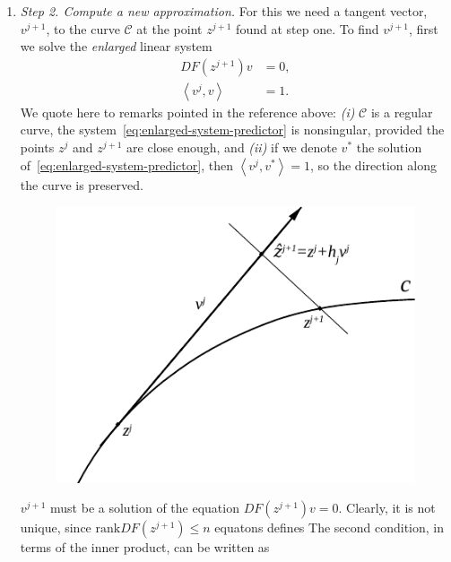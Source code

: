 \documentclass[11pt,reqno,twoside]{article}
\theoremstyle{remark}
\begin{document}
\begin{enumerate}[label = \emph{\arabic*.}]
\begin{displaymath}
\begin{split}
        z^{j}\right\rangle - h_{j}
        \end{split}
    \end{displaymath}
    that can be solved by some iterative method (for example, Newton
    method) taking form some the initial
    approximation. $z = \hat{z}^{j+1}$ is usually a good choice.
  \item \emph{Step 2. Compute a new approximation.} For this we need a
    tangent vector, $v^{j+1}$, to the curve $\mathcal{C}$ at the point
    $z^{j+1}$ found at step one. To find $v^{j+1}$, first we solve the
    \emph{enlarged} linear system
    \begin{equation}\label{eq:enlarged-system-predictor}
      \begin{split}
      DF\left(z^{j+1}\right)v &= 0,\\
      \left\langle v^{j}, v \right\rangle &= 1. 
    \end{split}
  \end{equation}
  We quote here to remarks pointed in the reference above: \emph{(i)} $\mathcal{C}$
  is a regular curve,  the
  system~\eqref{eq:enlarged-system-predictor} 
  is nonsingular, provided the points $z^{j}$ and $z^{j+1}$ are close
  enough, and \emph{(ii)} if we denote  $v^{\ast}$ the solution
  of~\eqref{eq:enlarged-system-predictor}, then 
  $\left\langle v^{j}, v^{\ast} \right\rangle = 1$, so the direction along the
  curve is preserved. 
%  
\begin{figure}[!t]
  \centering
  \includegraphics[scale=1.2]{arcstep}
 \caption{\label{fig:pseudo-arc}}
\end{figure}


    $v^{j+1}$ must be a solution of the
    equation $DF\left(z^{j+1}\right) v = 0$. Clearly, it is not unique, since
      $\text{rank} DF\left(z^{j+1}\right) \le n$ 
    equatons defines  
  The second condition, in terms of the inner product, can be written as


\end{enumerate}
\end{document}
